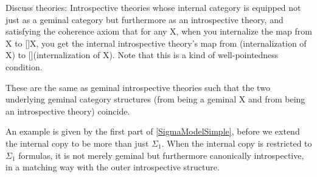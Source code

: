 \begin{TODOblock}
Discuss  theories: Introspective theories whose internal category is equipped not just as a geminal category but furthermore as an introspective theory, and satisfying the coherence axiom that for any X, when you internalize the map from X to []X, you get the internal introspective theory's map from (internalization of X) to [](internalization of X). Note that this is a kind of well-pointedness condition.

These are the same as geminal introspective theories such that the two underlying geminal category structures (from being a geminal X and from being an introspective theory) coincide.

An example is given by the first part of \cref{SigmaModelSimple}, before we extend the internal copy to be more than just $\Sigma_1$. When the internal copy is restricted to $\Sigma_1$ formulas, it is not merely geminal but furthermore canonically introspective, in a matching way with the outer introspective structure.
\end{TODOblock}



\fileend